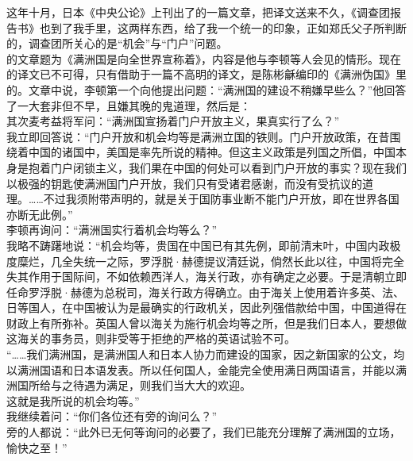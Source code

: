 这年十月，日本《中央公论》上刊出了的一篇文章，把译文送来不久，《调查团报告书》也到了我手里，这两样东西，给了我一个统一的印象，正如郑氏父子所判断的，调查团所关心的是“机会”与“门户”问题。\\

的文章题为《满洲国是向全世界宣称着》，内容是他与李顿等人会见的情形。现在的译文已不可得，只有借助于一篇不高明的译文，是陈彬龢编印的《满洲伪国》里的。文章中说，李顿第一个向他提出问题：“满洲国的建设不稍嫌早些么？”他回答了一大套非但不早，且嫌其晚的鬼道理，然后是：\\

其次麦考益将军问：“满洲国宣扬着门户开放主义，果真实行了么？”\\

我立即回答说：“门户开放和机会均等是满洲立国的铁则。门户开放政策，在昔围绕着中国的诸国中，美国是率先所说的精神。但这主义政策是列国之所倡，中国本身是抱着门户闭锁主义，我们果在中国的何处可以看到门户开放的事实？现在我们以极强的钥匙使满洲国门户开放，我们只有受诸君感谢，而没有受抗议的道理。……不过我须附带声明的，就是关于国防事业断不能门户开放，即在世界各国亦断无此例。”\\

李顿再询问：“满洲国实行着机会均等么？”\\

我略不踌躇地说：“机会均等，贵国在中国已有其先例，即前清末叶，中国内政极度糜烂，几全失统一之际，罗浮脱·赫德提议清廷说，倘然长此以往，中国将完全失其作用于国际间，不如依赖西洋人，海关行政，亦有确定之必要。于是清朝立即任命罗浮脱·赫德为总税司，海关行政方得确立。由于海关上使用着许多英、法、日等国人，在中国被认为是最确实的行政机关，因此列强借款给中国，中国道得在财政上有所弥补。英国人曾以海关为施行机会均等之所，但是我们日本人，要想做这海关的事务员，则非受等于拒绝的严格的英语试验不可。\\

“……我们满洲国，是满洲国人和日本人协力而建设的国家，因之新国家的公文，均以满洲国语和日本语发表。所以任何国人，金能完全使用满日两国语言，并能以满洲国所给与之待遇为满足，则我们当大大的欢迎。\\

这就是我所说的机会均等。”\\

我继续着问：“你们各位还有旁的询问么？”\\

旁的人都说：“此外已无何等询问的必要了，我们已能充分理解了满洲国的立场，愉快之至！”\\

